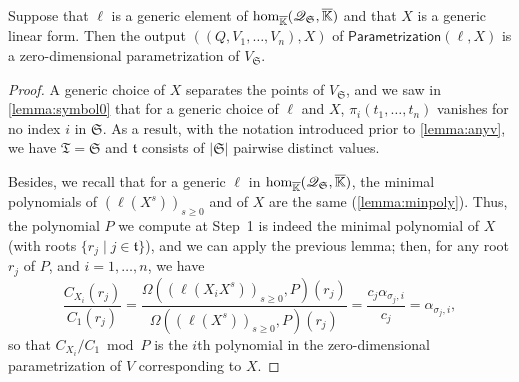 \documentclass[12pt]{article}
\newcommand{\minpoly}{P}
\newcommand{\lf}{X}
\newcommand{\residueI}{\mathscr{Q}}
\newcommand{\sqfree}{Q}
\def\Kbar {{\ensuremath{\overline{\mathbb{K}}}}}
\begin{document}
\begin{lemma}\label{lemma:para2}
  Suppose that $\ell$ is a generic element of ${\rm
    hom}_{\Kbar}(\residueI_\mathfrak{S},\Kbar)$ and that $\lf$ is a generic
  linear form. Then the output $((\sqfree,V_1,\dots,V_n),\lf)$ of
  $\mathsf{Parametrization}(\ell,\lf)$ is a zero-dimensional
  parametrization of $V_{\mathfrak{S}}$.
\end{lemma}
\begin{proof}
  A generic choice of $\lf$ separates the points of
  $V_{\mathfrak{S}}$, and we saw in \cref{lemma:symbol0} that for a
  generic choice of $\ell$ and $\lf$, $\pi_i(t_1,\dots,t_n)$ vanishes
  for no index $i$ in $\mathfrak{S}$.  As a result, with the notation
  introduced prior to \cref{lemma:anyv}, we have
  $\mathfrak{T}=\mathfrak{S}$ and $\mathfrak{t}$ consists of
  $|\mathfrak{S}|$ pairwise distinct values.

  Besides, we recall that for a generic $\ell$ in ${\rm
    hom}_{\Kbar}(\residueI_\mathfrak{S},\Kbar)$, the minimal polynomials of
  $(\ell(\lf^s))_{s \ge 0}$ and of $\lf$ are the same
  (\cref{lemma:minpoly}).  Thus, the polynomial $\minpoly$ we compute
  at Step~1 is indeed the minimal polynomial of $\lf$ (with roots
  $\{r_j \mid j \in \mathfrak{t}\}$), and we can apply the previous
  lemma; then, for any root $r_j$ of $\minpoly$, and $i=1,\dots,n$, we
  have
  $$\frac{ C_{X_i}(r_j)}{ C_1(r_j)} = \frac{\Omega((\ell(X_i
    \lf^s))_{s\ge0}, \minpoly)(r_j)}{\Omega((\ell(\lf^s))_{s\ge0} ,\minpoly)(r_j)}=
  \frac{c_j \alpha_{\sigma_j,i}}{c_j} = \alpha_{\sigma_j,i},$$ so that
  $ C_{X_i}/ C_1 \bmod P$ is the $i$th polynomial in the
  zero-dimensional parametrization of $V$ corresponding to $\lf$.
\end{proof}
\end{document}
